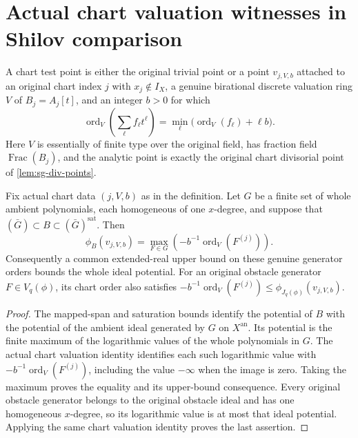\section{Actual chart valuation witnesses in Shilov comparison}

\begin{definition}
\label{def:c0n-chart-test-points}
\leanok
A chart test point is either the original trivial point or a point
$v_{j,V,b}$ attached to an original chart index $j$ with $x_j\notin I_X$,
a genuine birational discrete valuation ring $V$ of
$B_j=A_j[t]$, and an integer $b>0$ for which
\[
 \operatorname{ord}_V\!\left(\sum_\ell f_\ell t^\ell\right)
 =\min_\ell\bigl(\operatorname{ord}_V(f_\ell)+\ell b\bigr).
\]
Here $V$ is essentially of finite type over the original field, has
fraction field $\operatorname{Frac}(B_j)$, and the analytic point is
exactly the original chart divisorial point of \cref{lem:sg-div-points}.
\end{definition}

\begin{lemma}
\label{lem:c0n-chart-generator-orders}
\leanok
Fix actual chart data $(j,V,b)$ as in the definition.
Let $G$ be a finite set of whole ambient polynomials, each homogeneous of
one $x$-degree, and suppose that
$(\bar G)\subset B\subset(\bar G)^{\mathrm{sat}}$.
Then
\[
 \phi_B(v_{j,V,b})=
 \max_{F\in G}\left(-b^{-1}\operatorname{ord}_V(F^{(j)})\right).
\]
Consequently a common extended-real upper bound on these genuine generator
orders bounds the whole ideal potential.
For an original obstacle generator $F\in V_q(\phi)$, its chart order also
satisfies
$-b^{-1}\operatorname{ord}_V(F^{(j)})\le\phi_{J_q(\phi)}(v_{j,V,b})$.
\end{lemma}
\begin{proof}
The mapped-span and saturation bounds identify the potential of $B$ with
the potential of the ambient ideal generated by $G$ on $X^{\mathrm{an}}$.
Its potential is the finite maximum of the logarithmic values of the
whole polynomials in $G$.  The actual chart valuation identity identifies
each such logarithmic value with
$-b^{-1}\operatorname{ord}_V(F^{(j)})$, including the value $-\infty$
when the image is zero.  Taking the maximum proves the equality and its
upper-bound consequence.  Every original obstacle generator belongs to
the original obstacle ideal and has one homogeneous $x$-degree, so its
logarithmic value is at most that ideal potential.  Applying the same
chart valuation identity proves the last assertion.
\end{proof}

